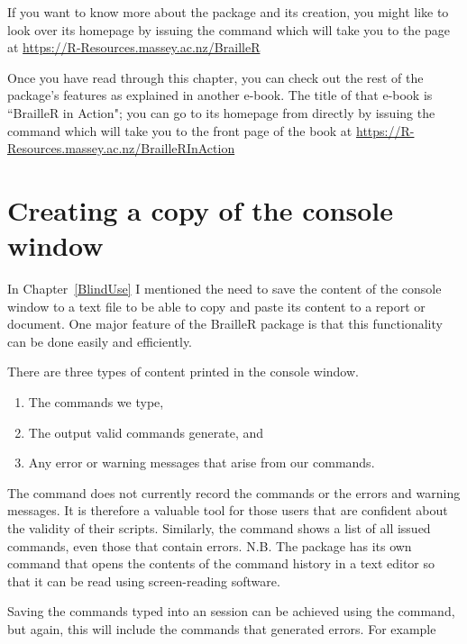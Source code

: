 If you want to know more about the  package and its creation, you might like to look over its homepage by issuing the  command which will take you to the page at
\url{https://R-Resources.massey.ac.nz/BrailleR}

Once you have read through this chapter, you can check out the rest of the  package's features as explained in another e-book. The title of that e-book is ``BrailleR in Action"; you can go to its homepage from \R{} directly by issuing the  command which will take you to the front page of the book at
\url{https://R-Resources.massey.ac.nz/BrailleRInAction}


 
 
\section{Creating a copy of the \R{} console window}\label{CreateCopyConsole} 
 
In Chapter~\ref{BlindUse} I mentioned the need to save the content of the console window to a text file to be able to copy and paste its content to a report or document. One major feature of the BrailleR package is that this functionality can be done easily and efficiently. 
 
There are three types of content printed in the console window.\begin{enumerate} 
\item The commands we type, 
\item The output valid commands generate, and 
\item Any error or warning messages that arise from our commands. 
\end{enumerate} 
 
The  command does not currently record the commands or the errors and warning messages. It is therefore a valuable tool for those \R{} users that are confident about the validity of their scripts. Similarly, the  command shows a list of all issued commands, even those that contain errors. N.B. The  package has its own  command that opens the contents of the command history in a text editor so that it can be read using screen-reading software.
 
Saving the commands typed into an \R{} session can be achieved using the  command, but again, this will include the commands that generated errors. For example 

